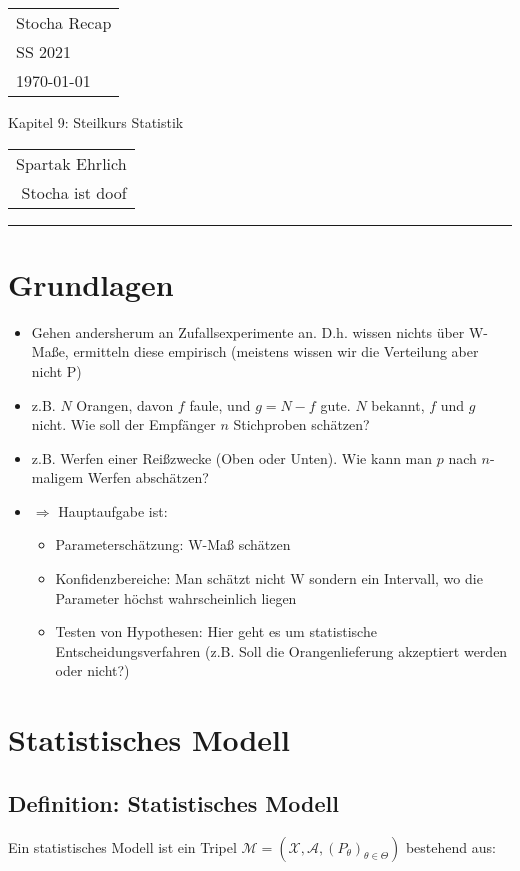 \documentclass[a4paper,11pt]{scrartcl}
\begin{document}
{\raggedright
\begin{tabular}{l}
    Stocha Recap \\
    SS 2021 \\
    \today{}
\end{tabular}}
\hfill
{\Large Kapitel 9: Steilkurs Statistik}
\hfill
\begin{tabular}{r}
    Spartak Ehrlich \\
    Stocha ist doof
\end{tabular}
\hrule

\section{Grundlagen}
\begin{itemize}
    \item Gehen andersherum an Zufallsexperimente an. D.h. wissen nichts über W-Maße, ermitteln diese empirisch (meistens wissen wir die Verteilung aber nicht P)
    \item z.B. $N$ Orangen, davon $f$ faule, und $g = N-f$ gute. $N$ bekannt, $f$ und $g$ nicht. Wie soll der Empfänger $n$ Stichproben schätzen?
    \item z.B. Werfen einer Reißzwecke (Oben oder Unten). Wie kann man $p$ nach $n$-maligem Werfen abschätzen?
    \item $\Rightarrow$ Hauptaufgabe ist:
    \begin{itemize}
        \item Parameterschätzung: W-Maß schätzen
        \item Konfidenzbereiche: Man schätzt nicht W sondern ein Intervall, wo die Parameter höchst wahrscheinlich liegen
        \item Testen von Hypothesen: Hier geht es um statistische Entscheidungsverfahren (z.B. Soll die Orangenlieferung akzeptiert werden oder nicht?)
    \end{itemize}
\end{itemize}

\section{Statistisches Modell}
\subsection{Definition: Statistisches Modell}
Ein statistisches Modell ist ein Tripel $\mathcal{M} =(\mathcal{X},\mathcal{A}, (P_\theta)_{\theta \in \Theta })$ bestehend aus:
\end{document}
